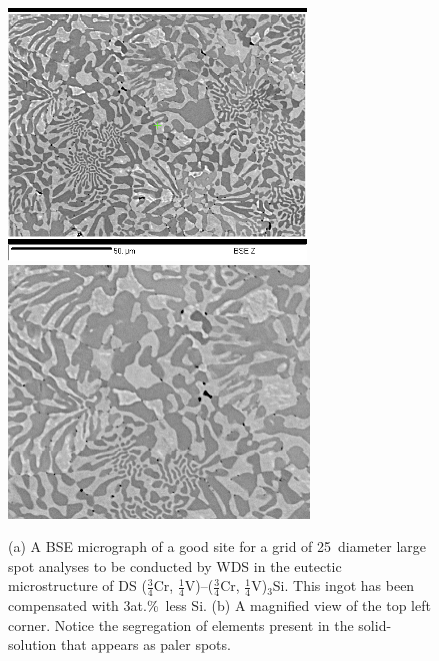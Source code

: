 %
\begin{figure}[H]
\begin{center}
\includegraphics[width=7.92cm]{_Sep6_gridiii_75Cr_scale_beforeBSE}
\includegraphics[width=8cm]{_Sep6_gridiii_75Cr_30BSE}
\caption{(a) A BSE micrograph of a good site for a grid of 25\micro\metre\ diameter large spot analyses to be conducted by WDS in the eutectic microstructure of DS ($\frac{3}{4}$Cr, $\frac{1}{4}$V)--($\frac{3}{4}$Cr, $\frac{1}{4}$V)$_3$Si.  This ingot has been compensated with 3at.\%\ less Si. (b) A magnified view of the top left corner.  Notice the segregation of elements present in the solid-solution that appears as paler spots.}
\label{fig:75CrgridiiiBSE}
\end{center}
\end{figure}

%


